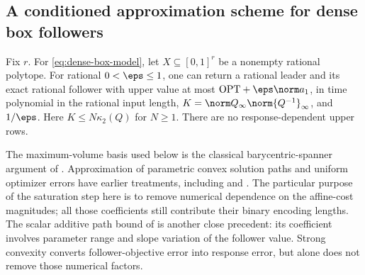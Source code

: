 \subsection{A conditioned approximation scheme for dense box followers}
\label{subsec:conditioned-algorithm}
\begin{theorem}\label{thm:conditioned-grid}
Fix \(r\). For \eqref{eq:dense-box-model}, let \(X\subseteq[0,1]^r\) be a
nonempty rational polytope. For rational \(0<\eps\le1\), one can return a
rational leader and its exact rational follower with upper value at most
\(\mathrm{OPT}+\eps\norm a_1\), in time polynomial in the rational input length,
\(K=\norm Q_\infty\norm{Q^{-1}}_\infty\), and \(1/\eps\). Here
\(K\le N\kappa_2(Q)\) for \(N\ge1\). There are no response-dependent upper rows.
\end{theorem}
The maximum-volume basis used below is the classical barycentric-spanner
argument of \citet[Proposition~2.2]{AwerbuchKleinberg2004}. Approximation of
parametric convex solution paths and uniform optimizer errors have earlier
treatments, including \citet{GiesenJaggiLaue2012} and
\citet[Theorem~4]{BemporadFilippi2001}. The particular purpose of the saturation
step here is to remove numerical dependence on the affine-cost magnitudes;
all those coefficients still contribute their binary encoding lengths.
The scalar additive path bound of \citet[Lemma~4 and Theorem~5]{GiesenEtAl2012}
is another close precedent: its coefficient involves parameter range and slope
variation of the follower value. Strong convexity converts follower-objective
error into response error, but alone does not remove those numerical factors.

